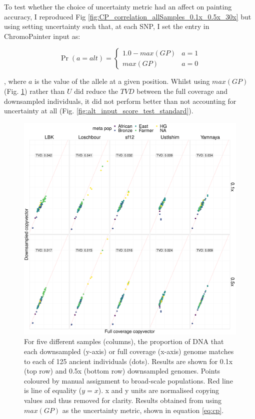 To test whether the choice of uncertainty metric had an affect on painting accuracy, I reproduced Fig \ref{fig:CP_correlation_allSamples_0.1x_0.5x_30x} but using setting uncertainty such that, at each SNP, I set the entry in ChromoPainter input as:

\begin{equation} \label{eq:cp_input_test}
\Pr(a = alt) =     
	\begin{cases}
		1.0 - max(GP) &  a = 1 \\
		max(GP) & a = 0  
	\end{cases}       
\end{equation}

, where $a$ is the value of the allele at a given position. Whilst using $max(GP)$ (Fig. \ref{fig:alt_input_score_test_uncertainty}) rather than $U$ did reduce the $TVD$ between the full coverage and downsampled individuals, it did not perform better than not accounting for uncertainty at all (Fig. \ref{fig:alt_input_score_test_standard}).

\begin{figure}[htp]
    \centering
    \includegraphics[width=1.0\textwidth]{../images/appendix/uncertainty.pdf}
    \caption{For five different samples (columns), the proportion of DNA that each downsampled (y-axis) or full coverage (x-axis) genome matches to each of 125 ancient individuals (dots). Results are shown for 0.1x (top row) and 0.5x (bottom row) downsampled genomes. Points coloured by manual assignment to broad-scale populations. Red line is line of equality ($y=x$). x and y units are normalised copying values and thus removed for clarity. Results obtained from using $max(GP)$ as the uncertainty metric, shown in equation \ref{eq:cp}.}
    \label{fig:alt_input_score_test_uncertainty}
\end{figure}

